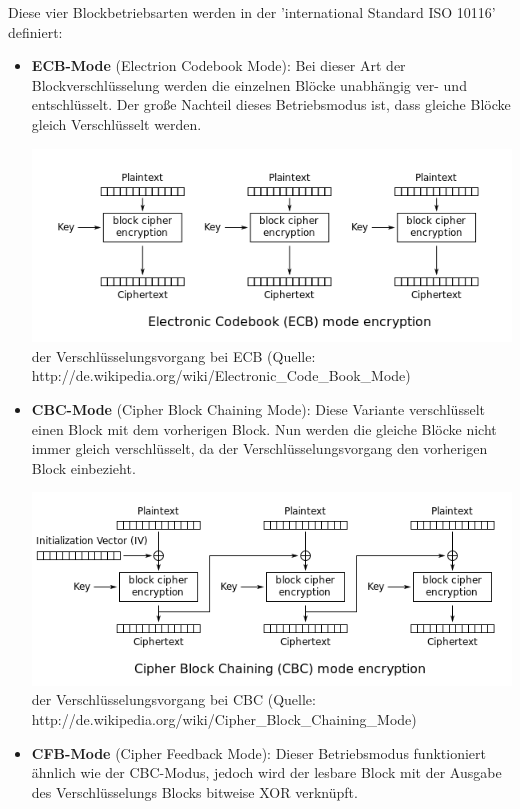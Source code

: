 \documentclass[12pt,a4paper]{report}
\begin{document}
\begin{onehalfspace}
Diese vier Blockbetriebsarten werden in der 'international Standard ISO 10116' definiert:

\begin{itemize}
\item \textbf{ECB-Mode} (Electrion Codebook Mode): Bei dieser Art der Blockverschlüsselung werden die einzelnen Blöcke unabhängig ver- und entschlüsselt. Der große Nachteil dieses Betriebsmodus ist, dass gleiche Blöcke gleich Verschlüsselt werden.

\begin{center}
\includegraphics[scale=0.7]{img/ecb.png}\\
der Verschlüsselungsvorgang bei ECB (Quelle: http://de.wikipedia.org/wiki/Electronic\_Code\_Book\_Mode)
\end{center}

\item \textbf{CBC-Mode} (Cipher Block Chaining Mode): Diese Variante verschlüsselt einen Block mit dem vorherigen Block. Nun werden die gleiche Blöcke nicht immer gleich verschlüsselt, da der Verschlüsselungsvorgang den vorherigen Block einbezieht.

\begin{center}
\includegraphics[scale=0.7]{img/cbc.png}\\
der Verschlüsselungsvorgang bei CBC (Quelle: http://de.wikipedia.org/wiki/Cipher\_Block\_Chaining\_Mode)
\end{center}

\item \textbf{CFB-Mode} (Cipher Feedback Mode): Dieser Betriebsmodus funktioniert ähnlich wie der CBC-Modus, jedoch wird der lesbare Block mit der Ausgabe des Verschlüsselungs Blocks bitweise XOR verknüpft.


\end{itemize}
\end{onehalfspace}
\end{document}
